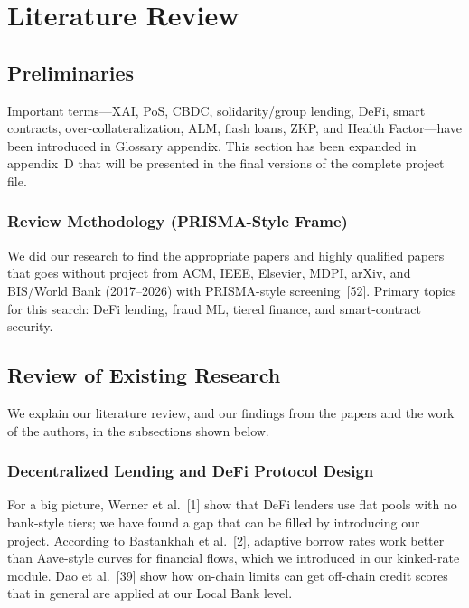 \documentclass[12pt,a4paper]{report}
\begin{document}
\chapter{Literature Review}

\section{Preliminaries}
\label{sec:preliminaries}

Important terms---XAI, PoS, CBDC, solidarity/group lending, DeFi, smart contracts, over-collateralization, ALM, flash loans, ZKP, and Health Factor---have been introduced in Glossary appendix. This section has been expanded in appendix~D that will be presented in the final versions of the complete project file.

\subsection{Review Methodology (PRISMA-Style Frame)}
\label{sec:lit-prisma}

We did our research to find the appropriate papers and highly qualified papers that goes without project from ACM, IEEE, Elsevier, MDPI, arXiv, and BIS/World Bank (2017--2026) with PRISMA-style screening~[52]. Primary topics for this search: DeFi lending, fraud ML, tiered finance, and smart-contract security.



\section{Review of Existing Research}
\label{sec:review-existing}

We explain our literature review, and our findings from the papers and the work of the authors, in the subsections shown below.

\subsection{Decentralized Lending and DeFi Protocol Design}

For a big picture, Werner et al.~[1] show that DeFi lenders use flat pools with no bank-style tiers; we have found a gap that can be filled by introducing our project. According to Bastankhah et al.~[2], adaptive borrow rates work better than Aave-style curves for financial flows, which we introduced in our kinked-rate module. Dao et al.~[39] show how on-chain limits can get off-chain credit scores that in general are applied at our Local Bank level.
\end{document}
